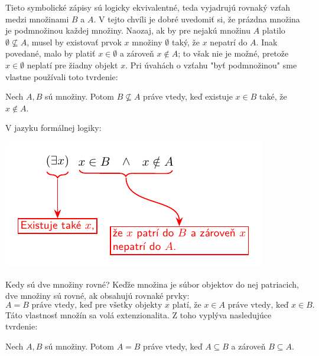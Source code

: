 Tieto symbolické zápisy sú logicky ekvivalentné, teda vyjadrujú rovnaký vzťah medzi množinami $B$ a $A$.
V tejto chvíli je dobré uvedomiť si, že prázdna množina je podmnožinou každej množiny.
Naozaj, ak by pre nejakú množinu $A$ platilo $\emptyset \not\subseteq A$, musel by existovať prvok $x$ množiny $\emptyset$ taký, že $x$ nepatrí do $A$.
Inak povedané, malo by platiť $x \in \emptyset$ a zároveň $x \notin A$;
to však nie je možné, pretože $x \in \emptyset$ neplatí pre žiadny objekt $x$.
Pri úvahách o vzťahu "byť podmnožinou" sme vlastne používali toto tvrdenie:

\begin{veta}
Nech $A, B$ sú množiny.
Potom $B \not\subseteq A$ práve vtedy, keď existuje $x \in B$ také, že $x \notin A$.
\end{veta}

\noindent V jazyku formálnej logiky:
\begin{center}
\includegraphics{figures/predn1_fig4.pdf}
\end{center}
Kedy sú dve množiny rovné?
Keďže množina je súbor objektov do nej patriacich, dve množiny sú rovné, ak obsahujú rovnaké prvky:
$$A = B \text{ práve vtedy, keď pre všetky objekty } x \text{ platí, že } x \in A \text{ práve vtedy, keď } x \in B.$$
Táto vlastnosť množín sa volá extenzionalita.
Z toho vyplýva nasledujúce tvrdenie:

\begin{veta}
Nech $A, B$ sú množiny. Potom $A=B$ práve vtedy, keď $A \subseteq B$ a zároveň $B \subseteq A$.
\end{veta}

